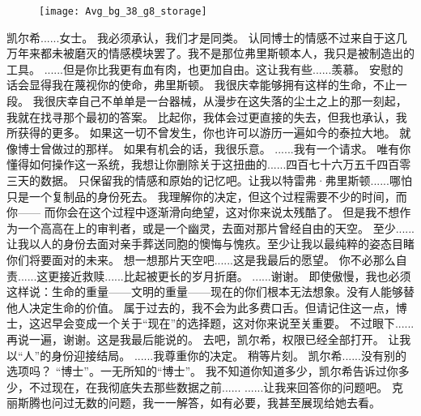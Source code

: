 \documentclass[openany]{book}
\begin{document}
\begin{figure}[h]
    \centering
    \texttt{[image: Avg\_bg\_38\_g8\_storage]}
\end{figure}
\begin{dialogue}
     凯尔希......女士。
     我必须承认，我们才是同类。
     认同博士的情感不过来自于这几万年来都未被磨灭的情感模块罢了。我不是那位弗里斯顿本人，我只是被制造出的工具。
     ......但是你比我更有血有肉，也更加自由。这让我有些......羡慕。
     安慰的话会显得我在蔑视你的使命，弗里斯顿。
     我很庆幸能够拥有这样的生命，不止一段。
     我很庆幸自己不单单是一台器械，从漫步在这失落的尘土之上的那一刻起，我就在找寻那个最初的答案。
     比起你，我体会过更直接的失去，但我也承认，我所获得的更多。
     如果这一切不曾发生，你也许可以游历一遍如今的泰拉大地。
     就像博士曾做过的那样。
     如果有机会的话，我很乐意。
     ......我有一个请求。
     唯有你懂得如何操作这一系统，我想让你删除关于这扭曲的......四百七十六万五千四百零三天的数据。
     只保留我的情感和原始的记忆吧。让我以特雷弗·弗里斯顿......哪怕只是一个复制品的身份死去。
     我理解你的决定，但这个过程需要不少的时间，而你——
     而你会在这个过程中逐渐滑向绝望，这对你来说太残酷了。
     但是我不想作为一个高高在上的审判者，或是一个幽灵，去面对那片曾经自由的天空。
     至少......让我以人的身份去面对亲手葬送同胞的懊悔与愧疚。至少让我以最纯粹的姿态目睹你们将要面对的未来。
     想一想那片天空吧......这是我最后的愿望。
     你不必那么自责......这更接近救赎......比起被更长的岁月折磨。
     ......谢谢。
     即使傲慢，我也必须这样说：生命的重量——文明的重量——现在的你们根本无法想象。没有人能够替他人决定生命的价值。
     属于过去的，我不会为此多费口舌。但请记住这一点，博士，这迟早会变成一个关于“现在”的选择题，这对你来说至关重要。
     不过眼下......再说一遍，谢谢。这是我最后能说的。
     去吧，凯尔希，权限已经全部打开。
     让我以“人”的身份迎接结局。
     ......我尊重你的决定。
     稍等片刻。
     凯尔希......没有别的选项吗？
     “博士”。一无所知的“博士”。
     我不知道你知道多少，凯尔希告诉过你多少，不过现在，在我彻底失去那些数据之前......
     ......让我来回答你的问题吧。
     克丽斯腾也问过无数的问题，我一一解答，如有必要，我甚至展现给她去看。

\end{dialogue}
\end{document}

